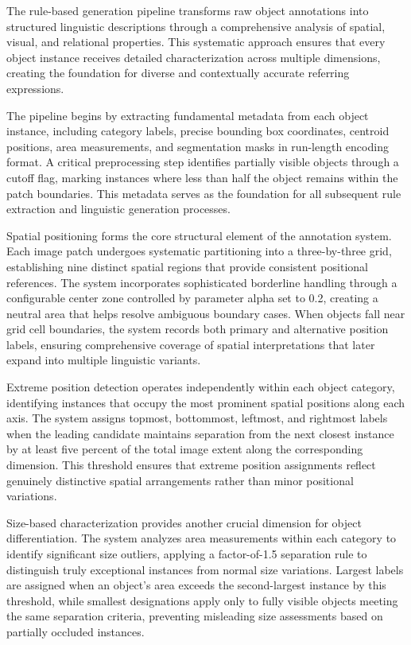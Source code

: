 The rule-based generation pipeline transforms raw object annotations into structured linguistic descriptions through a comprehensive analysis of spatial, visual, and relational properties. This systematic approach ensures that every object instance receives detailed characterization across multiple dimensions, creating the foundation for diverse and contextually accurate referring expressions.

The pipeline begins by extracting fundamental metadata from each object instance, including category labels, precise bounding box coordinates, centroid positions, area measurements, and segmentation masks in run-length encoding format. A critical preprocessing step identifies partially visible objects through a cutoff flag, marking instances where less than half the object remains within the patch boundaries. This metadata serves as the foundation for all subsequent rule extraction and linguistic generation processes.

Spatial positioning forms the core structural element of the annotation system. Each image patch undergoes systematic partitioning into a three-by-three grid, establishing nine distinct spatial regions that provide consistent positional references. The system incorporates sophisticated borderline handling through a configurable center zone controlled by parameter alpha set to 0.2, creating a neutral area that helps resolve ambiguous boundary cases. When objects fall near grid cell boundaries, the system records both primary and alternative position labels, ensuring comprehensive coverage of spatial interpretations that later expand into multiple linguistic variants.

Extreme position detection operates independently within each object category, identifying instances that occupy the most prominent spatial positions along each axis. The system assigns topmost, bottommost, leftmost, and rightmost labels when the leading candidate maintains separation from the next closest instance by at least five percent of the total image extent along the corresponding dimension. This threshold ensures that extreme position assignments reflect genuinely distinctive spatial arrangements rather than minor positional variations.

Size-based characterization provides another crucial dimension for object differentiation. The system analyzes area measurements within each category to identify significant size outliers, applying a factor-of-1.5 separation rule to distinguish truly exceptional instances from normal size variations. Largest labels are assigned when an object's area exceeds the second-largest instance by this threshold, while smallest designations apply only to fully visible objects meeting the same separation criteria, preventing misleading size assessments based on partially occluded instances.

